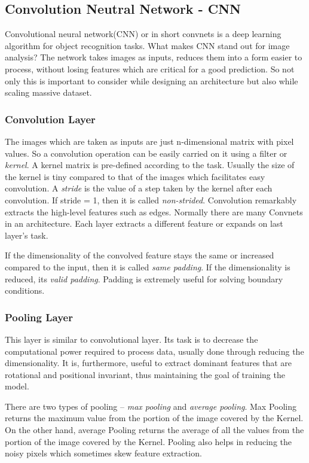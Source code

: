 \subsection{Convolution Neutral Network - CNN}
Convolutional neural network(CNN) or in short convnets is a deep learning algorithm for object recognition
tasks. What makes CNN stand out for image analysis? The network takes images as inputs, reduces them into a form
easier to process, without losing features which are critical for a good prediction. So
not only this is important to consider while designing an architecture but also while
scaling massive dataset.
\subsubsection*{Convolution Layer}
\label{subsubsec:convlayer}
The images which are taken as inputs are just n-dimensional matrix with pixel values. So a
convolution operation can be easily carried on it using a filter or \textit{kernel}. A
kernel matrix is pre-defined according to the task. Usually the size of the kernel is tiny
compared to that of the images which facilitates easy
convolution. A \textit{stride} is the value of a step taken by the kernel after each
convolution. If stride = 1, then it is called \textit{non-strided}. Convolution remarkably
extracts the high-level features such as edges. Normally there are many Convnets in an
architecture. Each layer extracts a different feature or expands on last layer's task.

If the dimensionality of the convolved feature stays the same or increased compared to the
input, then it is called \textit{same padding}. If the dimensionality is reduced, its
\textit{valid padding}. Padding is extremely useful for solving boundary conditions.

\subsubsection*{Pooling Layer}
\label{subsubsec:pooling}
This layer is similar to convolutional layer. Its task is to decrease the computational
power required to process data, usually done through reducing the dimensionality. It is,
furthermore, useful to extract dominant features that are rotational and positional
invariant, thus maintaining the goal of training the model.

There are two types of pooling -- \textit{max pooling} and \textit{average pooling}. Max Pooling
returns the maximum value from the portion of the image covered by the Kernel.
On the other hand, average Pooling returns the average of all the values
from the portion of the image covered by the Kernel. Pooling also helps in reducing the
noisy pixels which sometimes skew feature extraction.

